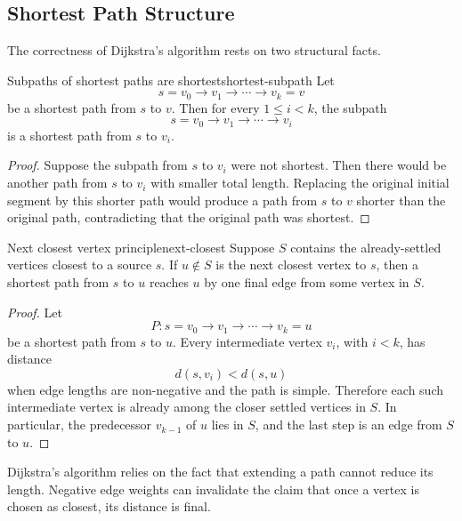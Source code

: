 \subsection{Shortest Path Structure}

The correctness of Dijkstra's algorithm rests on two structural facts.

\begin{theorem}{Subpaths of shortest paths are shortest}{shortest-subpath}
Let
\[
s=v_0\to v_1\to\cdots\to v_k=v
\]
be a shortest path from \(s\) to \(v\). Then for every \(1\le i<k\), the subpath
\[
s=v_0\to v_1\to\cdots\to v_i
\]
is a shortest path from \(s\) to \(v_i\).
\end{theorem}

\begin{proof}
Suppose the subpath from \(s\) to \(v_i\) were not shortest. Then there would be another path from \(s\) to \(v_i\) with smaller total length. Replacing the original initial segment by this shorter path would produce a path from \(s\) to \(v\) shorter than the original path, contradicting that the original path was shortest.
\end{proof}

\begin{theorem}{Next closest vertex principle}{next-closest}
Suppose \(S\) contains the already-settled vertices closest to a source \(s\). If \(u\notin S\) is the next closest vertex to \(s\), then a shortest path from \(s\) to \(u\) reaches \(u\) by one final edge from some vertex in \(S\).
\end{theorem}

\begin{proof}
Let
\[
P:s=v_0\to v_1\to\cdots\to v_k=u
\]
be a shortest path from \(s\) to \(u\). Every intermediate vertex \(v_i\), with \(i<k\), has distance
\[
d(s,v_i)<d(s,u)
\]
when edge lengths are non-negative and the path is simple. Therefore each such intermediate vertex is already among the closer settled vertices in \(S\). In particular, the predecessor \(v_{k-1}\) of \(u\) lies in \(S\), and the last step is an edge from \(S\) to \(u\).
\end{proof}

\begin{extension}[title={Why non-negative weights matter}]
Dijkstra's algorithm relies on the fact that extending a path cannot reduce its length. Negative edge weights can invalidate the claim that once a vertex is chosen as closest, its distance is final.
\end{extension}

